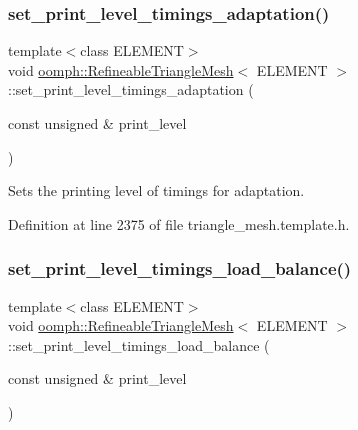 \subsubsection{\texorpdfstring{set\+\_\+print\+\_\+level\+\_\+timings\+\_\+adaptation()}{set\_print\_level\_timings\_adaptation()}}
{\footnotesize\ttfamily template$<$class E\+L\+E\+M\+E\+NT$>$ \\
void \hyperlink{classoomph_1_1RefineableTriangleMesh}{oomph\+::\+Refineable\+Triangle\+Mesh}$<$ E\+L\+E\+M\+E\+NT $>$\+::set\+\_\+print\+\_\+level\+\_\+timings\+\_\+adaptation (\begin{DoxyParamCaption}\item[{const unsigned \&}]{print\+\_\+level }\end{DoxyParamCaption})\hspace{0.3cm}{\ttfamily [inline]}}



Sets the printing level of timings for adaptation. 



Definition at line 2375 of file triangle\+\_\+mesh.\+template.\+h.

\mbox{\label{classoomph_1_1RefineableTriangleMesh_a1bde786a756e1a076df48fe11b8640f9}} 
\subsubsection{\texorpdfstring{set\+\_\+print\+\_\+level\+\_\+timings\+\_\+load\+\_\+balance()}{set\_print\_level\_timings\_load\_balance()}}
{\footnotesize\ttfamily template$<$class E\+L\+E\+M\+E\+NT$>$ \\
void \hyperlink{classoomph_1_1RefineableTriangleMesh}{oomph\+::\+Refineable\+Triangle\+Mesh}$<$ E\+L\+E\+M\+E\+NT $>$\+::set\+\_\+print\+\_\+level\+\_\+timings\+\_\+load\+\_\+balance (\begin{DoxyParamCaption}\item[{const unsigned \&}]{print\+\_\+level }\end{DoxyParamCaption})\hspace{0.3cm}{\ttfamily [inline]}}



